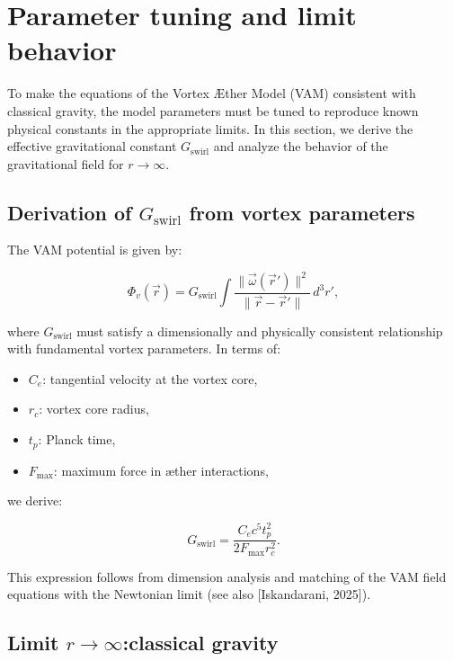 \section{Parameter tuning and limit behavior}

To make the equations of the Vortex Æther Model (VAM) consistent with classical gravity, the model parameters must be tuned to reproduce known physical constants in the appropriate limits. In this section, we derive the effective gravitational constant $G_{\text{swirl}}$ and analyze the behavior of the gravitational field for $r \to \infty$.

\subsection{Derivation of $G_{\text{swirl}}$ from vortex parameters}

The VAM potential is given by:

\begin{equation}
  \Phi_v(\vec{r}) = G_{\text{swirl}} \int \frac{\|\vec{\omega}(\vec{r}')\|^2}{\|\vec{r} - \vec{r}'\|} \, d^3r',
\end{equation}

where $G_{\text{swirl}}$ must satisfy a dimensionally and physically consistent relationship with fundamental vortex parameters. In terms of:

\begin{itemize}
  \item $C_e$: tangential velocity at the vortex core,
  \item $r_c$: vortex core radius,
  \item $t_p$: Planck time,
  \item $F_{\text{max}}$: maximum force in æther interactions,
\end{itemize}

we derive:

\begin{equation}
  G_{\text{swirl}} = \frac{C_e c^5 t_p^2}{2 F_{\text{max}} r_c^2}.
\end{equation}

This expression follows from dimension analysis and matching of the VAM field equations with the Newtonian limit (see also [Iskandarani, 2025]).

\subsection{Limit $r \to \infty$: ​​classical gravity}

